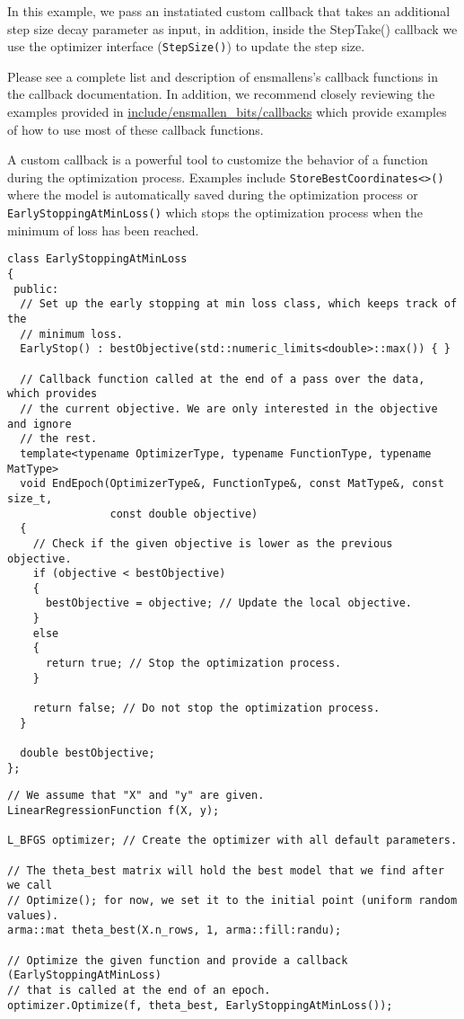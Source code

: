 In this example, we pass an instatiated custom callback that takes an additional
step size decay parameter as input, in addition, inside the StepTake() callback
we use the optimizer interface ({\tt StepSize()}) to update the step size.

Please see a complete list and description of ensmallens's callback functions in
the callback documentation. In addition, we recommend closely reviewing the
examples provided in
\url{include/ensmallen_bits/callbacks}
which provide examples of how to use most of these callback functions.








A custom callback is a powerful tool to customize the behavior of a function
during the optimization process. Examples include {\tt StoreBestCoordinates<>()}
where the model is automatically saved during the optimization process or {\tt
EarlyStoppingAtMinLoss()}  which stops the optimization process when the minimum
of loss has been reached.

\begin{verbatim}
class EarlyStoppingAtMinLoss
{
 public:
  // Set up the early stopping at min loss class, which keeps track of the
  // minimum loss.
  EarlyStop() : bestObjective(std::numeric_limits<double>::max()) { }

  // Callback function called at the end of a pass over the data, which provides
  // the current objective. We are only interested in the objective and ignore
  // the rest.
  template<typename OptimizerType, typename FunctionType, typename MatType>
  void EndEpoch(OptimizerType&, FunctionType&, const MatType&, const size_t,
                const double objective)
  {
    // Check if the given objective is lower as the previous objective.
    if (objective < bestObjective)
    {
      bestObjective = objective; // Update the local objective.
    }
    else
    {
      return true; // Stop the optimization process.
    }

    return false; // Do not stop the optimization process.
  }

  double bestObjective;
};
\end{verbatim}


\begin{verbatim}
// We assume that "X" and "y" are given.
LinearRegressionFunction f(X, y);

L_BFGS optimizer; // Create the optimizer with all default parameters.

// The theta_best matrix will hold the best model that we find after we call
// Optimize(); for now, we set it to the initial point (uniform random values).
arma::mat theta_best(X.n_rows, 1, arma::fill:randu);

// Optimize the given function and provide a callback (EarlyStoppingAtMinLoss)
// that is called at the end of an epoch.
optimizer.Optimize(f, theta_best, EarlyStoppingAtMinLoss());
\end{verbatim}
